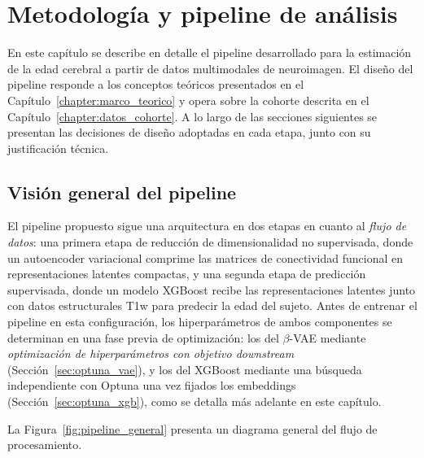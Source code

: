 \chapter{Metodología y pipeline de análisis}
\label{chapter:metodologia_pipeline}

En este capítulo se describe en detalle el pipeline desarrollado para la estimación de la edad cerebral a partir de datos multimodales de neuroimagen. El diseño del pipeline responde a los conceptos teóricos presentados en el Capítulo~\ref{chapter:marco_teorico} y opera sobre la cohorte descrita en el Capítulo~\ref{chapter:datos_cohorte}. A lo largo de las secciones siguientes se presentan las decisiones de diseño adoptadas en cada etapa, junto con su justificación técnica.

\section{Visión general del pipeline}
\label{sec:pipeline_overview}

El pipeline propuesto sigue una arquitectura en dos etapas en cuanto al \textit{flujo de datos}: una primera etapa de reducción de dimensionalidad no supervisada, donde un autoencoder variacional comprime las matrices de conectividad funcional en representaciones latentes compactas, y una segunda etapa de predicción supervisada, donde un modelo XGBoost recibe las representaciones latentes junto con datos estructurales T1w para predecir la edad del sujeto. Antes de entrenar el pipeline en esta configuración, los hiperparámetros de ambos componentes se determinan en una fase previa de optimización: los del $\beta$-VAE mediante \textit{optimización de hiperparámetros con objetivo downstream} (Sección~\ref{sec:optuna_vae}), y los del XGBoost mediante una búsqueda independiente con Optuna una vez fijados los embeddings (Sección~\ref{sec:optuna_xgb}), como se detalla más adelante en este capítulo.

La Figura~\ref{fig:pipeline_general} presenta un diagrama general del flujo de procesamiento.

